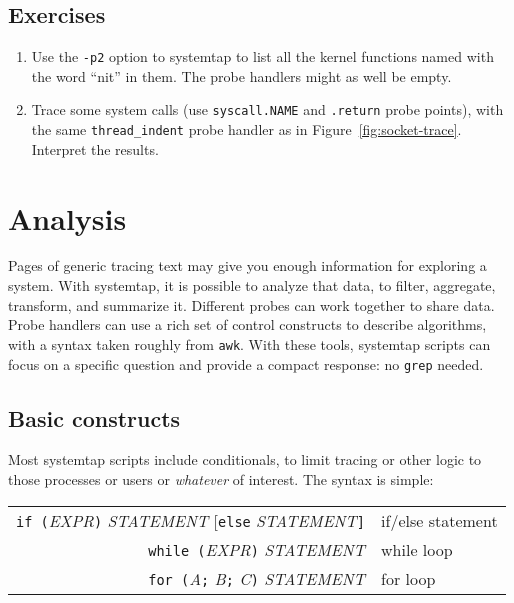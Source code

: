 \documentclass{article}
\renewcommand{\nomenclature}[2]{}
\begin{document}
\subsection{Exercises}

\begin{enumerate}
\item Use the \verb+-p2+ option to systemtap to list all the kernel
functions named with the word ``nit'' in them.  The probe handlers
might as well be empty.

\item Trace some system calls (use \verb+syscall.NAME+ and \verb+.return+
probe points), with the same \verb+thread_indent+ probe handler as in
Figure~\ref{fig:socket-trace}.  Interpret the results.

\end{enumerate}

\section{Analysis}

Pages of generic tracing text may give you enough information for
exploring a system.  With systemtap, it is possible to analyze that
data, to filter, aggregate, transform, and summarize it.  Different
probes can work together to share data.  Probe handlers can use a rich
set of control constructs to describe algorithms, with a syntax taken
roughly from \verb+awk+.  With these tools, systemtap scripts can
focus on a specific question and provide a compact response: no
\verb+grep+ needed.
\nomenclature{awk}{A classic UNIX stream processing language.}

\subsection{Basic constructs}

Most systemtap scripts include conditionals, to limit tracing or other
logic to those processes or users or {\em whatever} of interest.  The
syntax is simple:

\begin{tabular}{rl}
\verb+if (+{\em EXPR}\verb+)+ {\em STATEMENT} [\verb+else+ {\em STATEMENT}\verb+]+ & if/else statement \\
\verb+while (+{\em EXPR}\verb+)+ {\em STATEMENT} & while loop \\
\verb+for (+{\em A}\verb+;+ {\em B}\verb+;+ {\em C}\verb+)+ {\em STATEMENT} & for loop \\
\end{tabular}
\end{document}
